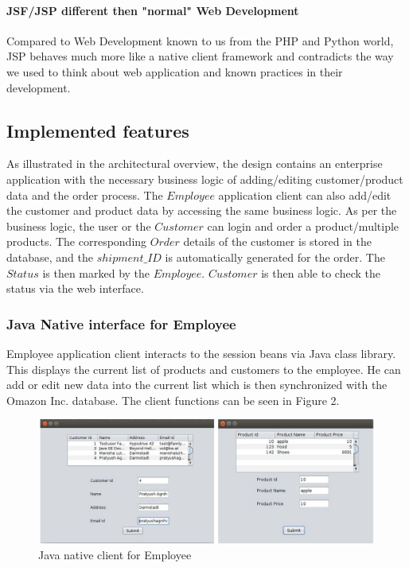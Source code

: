 \documentclass[twoside,colorbacktitle,accentcolor=tud1b]{tudexercise}
\begin{document}
\paragraph{JSF/JSP different then "normal" Web Development}
Compared to Web Development known to us from the PHP and Python world, JSP behaves much more like a native client framework and contradicts the way we used to think about web application and known practices in their development.

 \subsection{Implemented features}
As illustrated in the architectural overview, the design contains an enterprise application with the necessary business logic of adding/editing customer/product data and the order process. The $Employee$ application client can also add/edit the customer and product data by accessing the same business logic. As per the business logic, the user or the $Customer$ can login and order a product/multiple products. The corresponding $Order$ details of the customer is stored in the database, and the $shipment\_ID$ is automatically generated for the order. The $Status$ is then marked by the $Employee$. $Customer$ is then able to check the status via the web interface.

\subsubsection{Java Native interface for Employee}
Employee application client interacts to the session beans via Java class library. This displays the current list of products and customers to the employee. He can add or edit new data into the current list which is then synchronized with the Omazon Inc. database. The client functions can be seen in Figure 2.

\begin{figure}[h!]
  \centering
   \includegraphics[width=150mm]{native}
   \caption{Java native client for Employee}
\end{figure}
\end{document}
